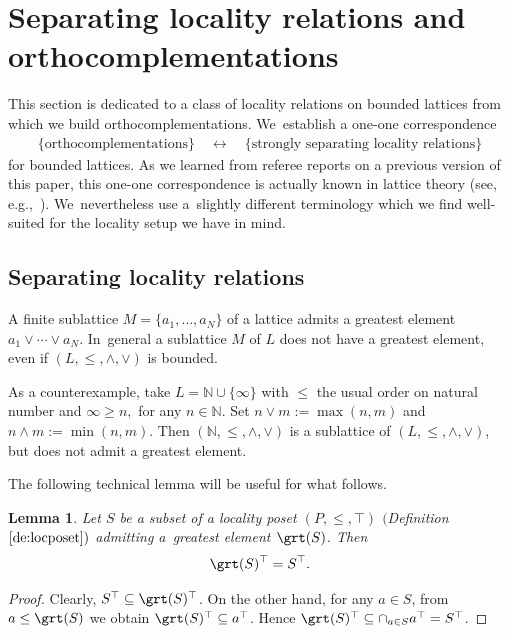 \documentclass[10pt,a4paper]{amsart}
\numberwithin{equation}{section}
\newtheorem{Lemma}[Theorem]{Lemma}
\newcommand{\N}{\mathbb{N}}
\newcommand{\loc}{locality\xspace}
\newcommand{\pone}{separating\xspace }
\def \Pone {Separating\xspace }
\begin{document}
\section{\Pone \loc relations and orthocomplementations}
This section is dedicated to a class of \loc relations on bounded lattices from which we build orthocomplementations. We~establish a one-one correspondence
\begin{gather*}
\{\text{orthocomplementations}\} \quad \longleftrightarrow\quad \{\text{strongly \pone \loc relations}\}
\end{gather*}
for bounded lattices. As we learned from referee reports on a previous version of this paper, this one-one correspondence is actually known in lattice theory (see, e.g.,~\cite{CM}). We~nevertheless use a~slightly different terminology which we find well-suited for the locality setup we have in mind.

\subsection {\Pone \loc relations}

A finite sublattice $M=\{a_1,\dots,a_N\}$ of a lattice admits a greatest element $a_1\vee\cdots\vee a_N$. In~general a sublattice $M$ of $L$ does not have a greatest element, even if $(L,\leq,\wedge, \vee)$ is bounded.

\begin{coex} %
	As a
	counterexample, take $L=\N \cup \{\infty \}$
	with $\leq$ the usual order on natural number and $\infty \ge n,$ for any $n\in \N$.
	Set $n\vee m:=\max(n,m)$ and $n\wedge m:=\min(n,m)$. Then $(\N,\leq,\wedge, \vee)$ is a sublattice of $(L,\leq,\wedge, \vee)$, but does not admit
	a greatest element.
\end{coex}
The following technical lemma will be useful for what follows.
\begin{Lemma} \label{lem:maxtop}
	Let $S $ be a subset of a locality poset $(P,\leq,\top)$ $($Definition~$\ref{de:locposet})$ admitting a~greatest element $\grt(S)$. Then
	\begin{gather}\label{eq:maxtop}
	\grt (S)^\top= S^\top.
	\end{gather}
\end{Lemma}
\begin{proof}
Clearly, $S^\top \subseteq \grt (S)^\top$. On the other hand, for any $a\in S$, from $a\leq \grt (S)$ we obtain $\grt (S)^\top \subseteq a^\top$. Hence $\grt (S)^\top \subseteq \cap_{a\in S} a^\top =S^\top$.
\end{proof}
\end{document}
